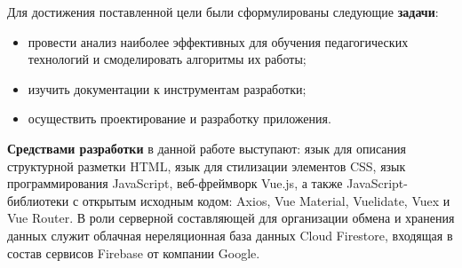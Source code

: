 Для достижения поставленной цели были сформулированы следующие \textbf{задачи}:

\begin{itemize}
	\item провести анализ наиболее эффективных для обучения педагогических технологий и смоделировать алгоритмы их работы;
	\item изучить документации к инструментам разработки;
	\item осуществить проектирование и разработку приложения.
\end{itemize}

\textbf{Средствами разработки} в данной работе выступают: язык для описания структурной разметки HTML, язык для стилизации элементов CSS, язык программирования JavaScript, веб-фреймворк Vue.js, а также JavaScript-библиотеки с открытым исходным кодом: Axios, Vue Material, Vuelidate, Vuex и Vue Router. В роли серверной составляющей для организации обмена и хранения данных служит облачная нереляционная база данных Cloud Firestore, входящая в состав сервисов Firebase от компании Google.

